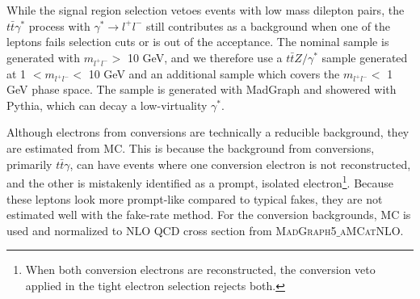 While the signal region selection vetoes events with low mass dilepton pairs, the $t\bar{t}\gamma^{*}$ process with $\gamma^{*}\rightarrow l^{+}l^{-}$ still contributes as a background when one of the leptons fails
selection cuts or is out of the acceptance. The nominal \ttz sample is generated with $m_{l^{+}l^{-}} >$ 10 GeV, and we therefore use a $t\bar{t}Z/\gamma^{*}$ sample generated at 1 $< m_{l^{+}l^{-}} <$ 10 GeV
and an additional \ttbar sample which covers the $ m_{l^{+}l^{-}} <$ 1 GeV phase space. The \ttbar sample is generated with MadGraph and showered with Pythia, which can decay a low-virtuality $\gamma^{*}$.

Although electrons from conversions are technically a reducible background, they are estimated from MC. This is because the background from conversions, primarily $t\bar{t}\gamma$, can have events where one conversion
electron is not reconstructed, and the other is mistakenly identified as a prompt, isolated electron\footnote{When both conversion electrons are reconstructed, the conversion veto applied in the tight electron selection
rejects both.}. Because these leptons look more prompt-like compared to typical fakes, they are not estimated well with the fake-rate method. For the conversion backgrounds, MC is used and normalized to NLO QCD cross section
from \textsc{MadGraph5$\_$aMCatNLO}.

